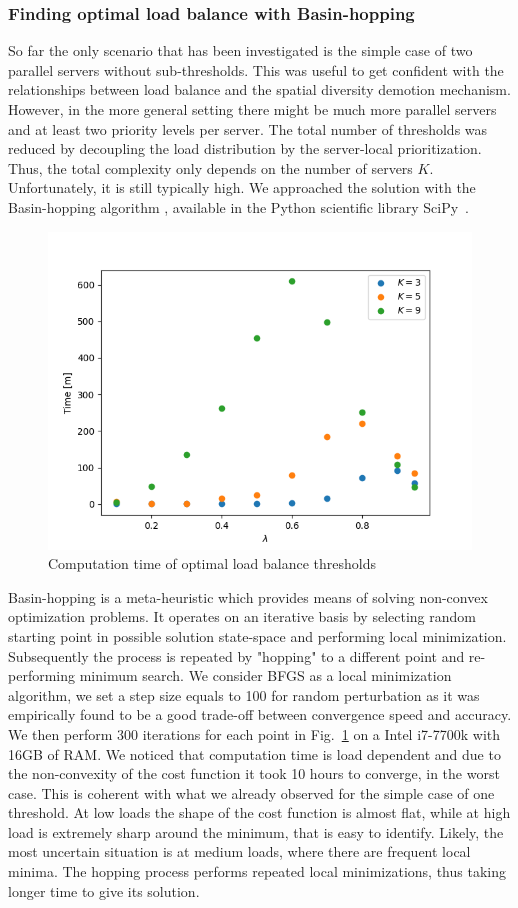 \subsubsection{Finding optimal load balance with Basin-hopping}
So far the only scenario that has been investigated is the simple case of two parallel servers without sub-thresholds. This was useful to get confident with the relationships between load balance and the spatial diversity demotion mechanism. However, in the more general setting there might be much more parallel servers and at least two priority levels per server. The total number of thresholds was reduced by decoupling the load distribution by the server-local prioritization. Thus, the total complexity only depends on the number of servers $K$. Unfortunately, it is still typically high. We approached the solution with the Basin-hopping algorithm \cite{basinhoppin}, available in the Python scientific library SciPy~\cite{scipy}. 
\begin{figure}
	\centering
	\includegraphics[width=.6\textwidth]{Chapter3/Figures/lb_opt_computation_time}
	\caption{Computation time of optimal load balance thresholds}
	\label{fig:lbopt-time}
\end{figure}%
Basin-hopping is a meta-heuristic which provides means of solving non-convex optimization problems.
It operates on an iterative basis by selecting random starting point in possible solution state-space and performing local minimization. 
Subsequently the process is repeated by "hopping" to a different point and re-performing minimum search.
We consider BFGS as a local minimization algorithm, we set a step size equals to 100 for random perturbation as it was empirically found to be a good trade-off between convergence speed and accuracy.
We then perform 300 iterations for each point in Fig.~\ref{fig:lbopt-time} on a Intel i7-7700k with 16GB of RAM.
We noticed that computation time is load dependent and due to the non-convexity of the cost function it took 10 hours to converge, in the worst case. This is coherent with what we already observed for the simple case of one threshold. At low loads the shape of the cost function is almost flat, while at high load is extremely sharp around the minimum, that is easy to identify. Likely, the most uncertain situation is at medium loads, where there are frequent local minima. The hopping process performs repeated local minimizations, thus taking longer time to give its solution. 
